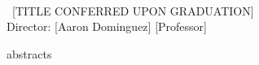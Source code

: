 \begin{center}
    \MyTitle \\
    \vspace*{0.5\baselineskip}
    \MyAuthor~[TITLE CONFERRED UPON GRADUATION] \\
    \vspace*{0.5\baselineskip}
    Director: [Aaron Dominguez] [Professor]
\end{center}
\thispagestyle{empty}

\begingroup
\renewcommand{\clearpage}{}
\singlespacing



abstracts
\noindent
\thispagestyle{empty}

\endgroup


